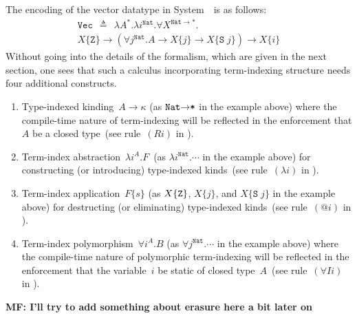 The encoding of the vector datatype in System~\Fi\ is as follows: 
\vspace*{-5pt}
\begin{multline*}\!\!\!\!\!\!\!
\texttt{{Vec}}\:\:\triangleq\:\:\lambda A^{*}.\lambda i^{\texttt{{Nat}}}.
\forall X^{\texttt{{Nat}}\to*}.\\
X\{\texttt{{Z}}\}\to
(\forall j^{\texttt{{Nat}}}.A\to X\{j\}\to X\{\texttt{{S}}\; j\})\to X\{i\}
\end{multline*}
Without going into the details of the formalism, which are given in the
next section, one sees that such a calculus incorporating term-indexing
structure needs four additional constructs.
\begin{enumerate}
\item 
  Type-indexed kinding~$A\to\kappa$ (as $\texttt{{Nat}\ensuremath{\to}*}$
  in the example above) where the compile-time nature of term-indexing
  will be reflected in the enforcement that $A$ be a closed type~(see
  rule~$(Ri)$ in ).
\item 
  Term-index abstraction~$\lambda i^A.F$~(as $\lambda
  i^{\texttt{{Nat}}}.\cdots$ in the example above) for constructing (or
  introducing) type-indexed kinds~(see rule~$(\lambda i)$ in
  ).  
\item 
  Term-index application~$F\{s\}$ (as $X\{{\tt Z}\}$, $X\{j\}$, and
  $X\{\texttt{S}\;j\}$ in the example above) for destructing (or
  eliminating) type-indexed kinds~(see rule~$(@i)$ in ). 
\item 
  Term-index polymorphism~$\forall i^A.B$ (as $\forall
  j^{\texttt{{Nat}}}.\cdots$ in the example above) where the compile-time
  nature of polymorphic term-indexing will be reflected in the enforcement
  that the variable~$i$ be static of closed type~$A$~(see rule~$(\forall
  Ii)$ in ).
\end{enumerate}

\textbf{MF: I'll try to add something about erasure here a bit later on}

